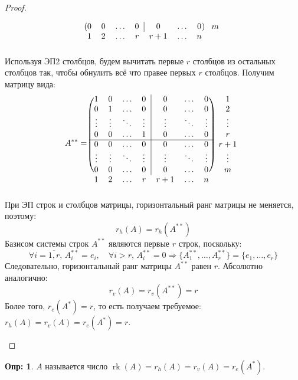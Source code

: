 \documentclass[12pt]{article}
\theoremstyle{definition}
\newtheorem{defn}{Опр:}
\DeclareMathOperator{\rk}{\text{rk}}
\begin{document}
\begin{proof}
\begin{enumerate}[label=\arabic*)]
$$\begin{blockarray}{cccccccc}
\begin{block}{(cccc|ccc)c}
					0 & 0 & \dotsc & 0 & 0 & \dotsc & 0 & m\\
				\end{block}
				1 & 2 & \dotsc & r & r+1 & \dotsc & n & 
			\end{blockarray}
		$$
		Используя ЭП$2$ столбцов, будем вычитать первые $r$ столбцов из остальных столбцов так, чтобы обнулить всё что правее первых $r$ столбцов. Получим матрицу вида:
		$$
			A^{**} = \begin{blockarray}{cccccccc}
				\begin{block}{(cccc|ccc)c}
					1 & 0 & \dotsc & 0 & 0 & \dotsc & 0 & 1\\
					0 & 1 & \dotsc & 0 & 0 & \dotsc & 0 & 2\\
					\vdots & \vdots & \ddots & \vdots & \vdots & \ddots & \vdots & \vdots\\
					0 & 0 & \dotsc & 1 & 0 & \dotsc & 0 & r\\ \cline{1-7}
					0 & 0 & \dotsc & 0 & 0 & \dotsc & 0 & r+ 1\\
					\vdots & \vdots & \ddots & \vdots & \vdots & \ddots & \vdots & \vdots\\
					0 & 0 & \dotsc & 0 & 0 & \dotsc & 0 & m\\
				\end{block}
				1 & 2 & \dotsc & r & r+1 & \dotsc & n & 
			\end{blockarray}
		$$
		При ЭП строк и столбцов матрицы, горизонтальный ранг матрицы не меняется, поэтому:
		$$
			r_h(A) = r_h(A^{**})
		$$
		Базисом системы строк $A^{**}$ являются первые $r$ строк, поскольку: 
		$$
			\forall i = \overline{1,r}, \, A_i^{**} = e_i, \quad \forall i > r, \, A_i^{**} = 0 \Rightarrow \{A_1^{**}, \dotsc, A_r^{**}\} = \{e_1,\dotsc, e_r\} 
		$$
		Следовательно, горизонтальный ранг матрицы $A^{**}$ равен $r$. Абсолютно аналогично:
		$$
			r_v(A) = r_v{(A^{**})} = r
		$$
		Более того, $r_e{(A^*)} = r$, то есть получаем требуемое: $r_h(A) = r_v(A) = r_e(A^*) = r$.
	\end{enumerate}
\end{proof}

\begin{defn}
	 $A$ называется число $\rk(A) = r_h(A) = r_v(A) = r_{e}(A^*)$.
\end{defn}
\end{document}
